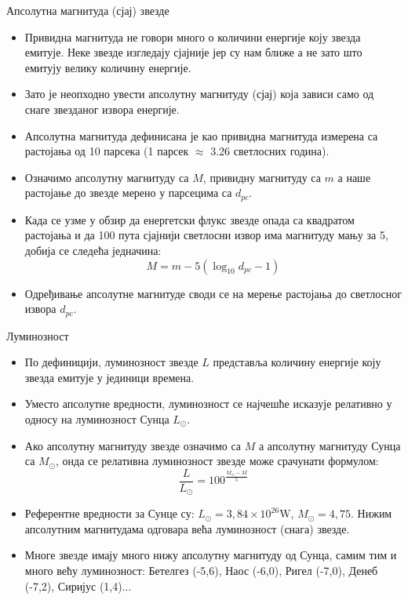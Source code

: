 \documentclass[aspectratio=169, xcolor=table, 10pt]{beamer}
\theoremstyle{definition}
\begin{document}
\begin{frame}{Апсолутна магнитуда (сјај) звезде}
  \begin{itemize}
    \item Привидна магнитуда не говори много о количини енергије коју звезда емитује\cite{wiki1}. Неке звезде изгледају сјајније јер су нам ближе а не зато што емитују велику количину енергије.
    \item Зато је неопходно увести апсолутну магнитуду (сјај) која зависи само од снаге звезданог извора енергије.
    \item Апсолутна магнитуда дефинисана је као привидна магнитуда измерена са растојања од 10 парсека (1 парсек $\approx$ 3.26 светлосних година).
    \item Означимо апсолутну магнитуду са $M$, привидну магнитуду са $m$ а наше растојање до звезде мерено у парсецима са $d_{pc}$.
    \item Када се узме у обзир да енергетски флукс звезде опада са квадратом растојања и да 100 пута сјајнији светлосни извор има магнитуду мању за 5, добија се следећа једначина:
      \begin{equation*}
        M=m-5(\log_{10}d_{pc} - 1)
      \end{equation*}
    \item Одређивање апсолутне магнитуде своди се на мерење растојања до светлосног извора $d_{pc}$.
  \end{itemize}
\end{frame}

\begin{frame}{Луминозност}
  \begin{itemize}
    \item По дефиницији, луминозност звезде $L$ представља количину енергије коју звезда емитује у јединици времена.
    \item Уместо апсолутне вредности, луминозност се најчешће исказује релативно у односу на луминозност Сунца $L_\odot$.
    \item Ако апсолутну магнитуду звезде означимо са $M$ а апсолутну магнитуду Сунца са $M_\odot$, онда се релативна луминозност звезде може срачунати формулом:
      \begin{equation*}
        \frac{L}{L_\odot} = 100^\frac{M_\odot-M}{5}
      \end{equation*}
    \item Референтне вредности за Сунце су: $L_\odot=3,84\times 10^{26}\text{W}$, $M_\odot=4,75$. Нижим апсолутним магнитудама одговара већа луминозност (снага) звезде.
    \item Многе звезде имају много нижу апсолутну магнитуду од Сунца, самим тим и много већу луминозност: Бетелгез (-5,6), Наос (-6,0), Ригел (-7,0), Денеб (-7,2), Сиријус (1,4)...
  \end{itemize}
\end{frame}
\end{document}
